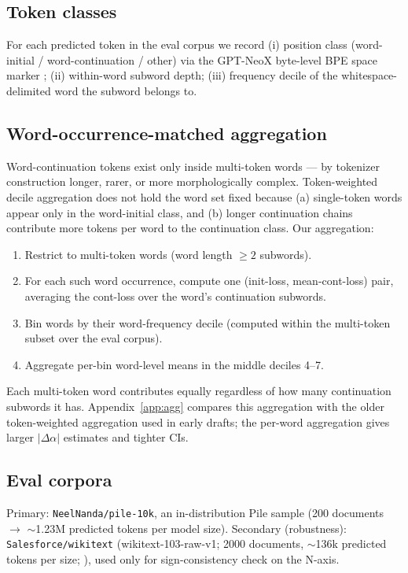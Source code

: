 \documentclass[10pt]{article}
\newcommand{\dalpha}{\Delta\alpha}
\begin{document}
\subsection{Token classes}

For each predicted token in the eval corpus we record (i) position
class (word-initial / word-continuation / other) via the GPT-NeoX
byte-level BPE space marker \citep{sennrich2016bpe, black2022gptneox};
(ii) within-word subword depth; (iii) frequency decile of the
whitespace-delimited word the subword belongs to.

\subsection{Word-occurrence-matched aggregation}
\label{sec:agg}

Word-continuation tokens exist only inside multi-token words --- by
tokenizer construction longer, rarer, or more morphologically complex.
Token-weighted decile aggregation does not hold the word set fixed
because (a) single-token words appear only in the word-initial class,
and (b) longer continuation chains contribute more tokens per word
to the continuation class. Our aggregation:
\begin{enumerate}
  \item Restrict to multi-token words (word length $\geq 2$
        subwords).
  \item For each such word occurrence, compute one (init-loss,
        mean-cont-loss) pair, averaging the cont-loss over the
        word's continuation subwords.
  \item Bin words by their word-frequency decile (computed within
        the multi-token subset over the eval corpus).
  \item Aggregate per-bin word-level means in the middle deciles
        4--7.
\end{enumerate}
Each multi-token word contributes equally regardless of how many
continuation subwords it has. Appendix~\ref{app:agg} compares this
aggregation with the older token-weighted aggregation used in early
drafts; the per-word aggregation gives larger $|\dalpha|$ estimates
and tighter CIs.

\subsection{Eval corpora}

Primary: \verb|NeelNanda/pile-10k|, an in-distribution Pile sample
(200 documents $\to$ $\sim$1.23M predicted tokens per model size).
Secondary (robustness): \verb|Salesforce/wikitext|
(wikitext-103-raw-v1; 2000 documents, $\sim$136k predicted tokens
per size; \citealp{merity2017wikitext}), used only for sign-consistency
check on the N-axis.
\end{document}
